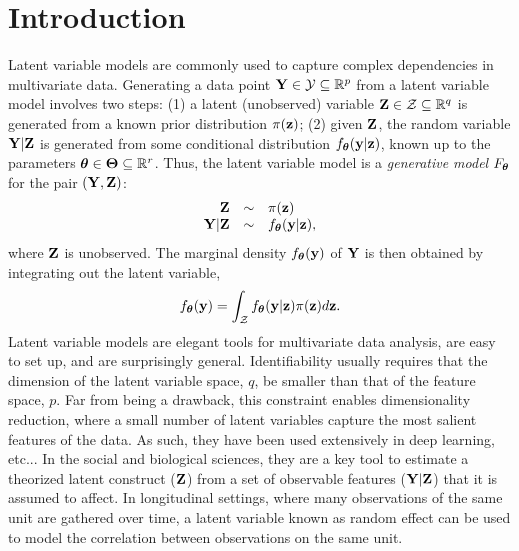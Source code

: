 \documentclass[twoside,11pt]{article}
\newcommand{\jb}[2][]{\todo[color=jbcolor, caption={JB}, #1]{#2}}
\begin{document}
\newpage


\section{Introduction}
 Latent variable models are commonly used to capture complex dependencies in multivariate data. Generating a data point ${\bf Y}\in \mathcal Y \subseteq \mathbb R^p$ from a latent variable model  involves two steps: (1) a latent (unobserved) variable ${\bf Z}\in \mathcal Z \subseteq\mathbb R^q$ is generated from a known prior distribution $\pi({\bf z})$; (2) given ${\bf Z}$, the random variable ${\bf Y}|{\bf Z}$ is generated from some conditional distribution $f_{\bm{\theta}}({\bf y}|{\bf z})$, known up to the parameters ${\bm{\theta}}\in\bm\Theta\subseteq \mathbb R^r$\jb{Does it work for nonparametric?}. Thus, the latent variable model is a \textit{generative model} $F_{\bm{\theta}}$ for the pair $({\bf Y}, {\bf Z})$:
%
\begin{align}
    \begin{matrix}
        \hfill\Z &\sim& \pi(\z)\hfill\\
        \hfill\Y|\Z &\sim& f_\bt(\y|\z)\hfill,
    \end{matrix}
    \label{eqn:generative-model-general}
\end{align}
%
where ${\bf Z}$ is unobserved.
% 
The marginal density $f_{\bm{\theta}}({\bf y})$ of ${\bf Y}$ is then obtained by integrating out the latent variable, 
%
\begin{equation}
    f_{\bm{\theta}}({\bf y}) = \int_{\mathcal Z} f_{\bm{\theta}}({\bf y}|{\bf z})\pi({\bf z})d{\bf z}.
\end{equation}
%
Latent variable models are elegant tools for multivariate data analysis, are easy to set up, and are surprisingly general. Identifiability usually requires that the dimension of the latent variable space, $q$, be smaller than that of the feature space, $p$. Far from being a drawback, this constraint enables dimensionality reduction, where a small number of latent variables capture the most salient features of the data. As such, they have been used extensively in deep learning, etc... In the social and biological sciences, they are a key tool to estimate a theorized latent construct (${\bf Z}$) from a set of observable features (${\bf Y}|{\bf Z}$) that it is assumed to affect. In longitudinal settings, where many observations of the same unit are gathered over time, a latent variable known as random effect can be used to model the correlation between observations on the same unit.
\end{document}
